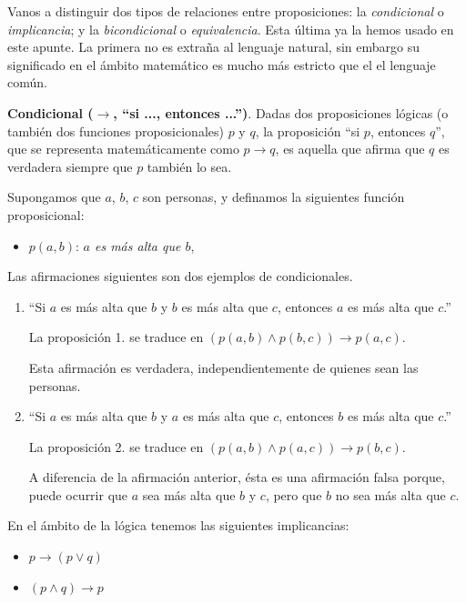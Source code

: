 Vanos a distinguir dos tipos de relaciones entre proposiciones: la \emph{condicional} o \emph{implicancia}; y la \emph{bicondicional} o \emph{equivalencia}. 
Esta última ya la hemos usado en este apunte.
La primera no es extraña al lenguaje natural, sin embargo su significado en el ámbito matemático es mucho más estricto que el el lenguaje común.


\textbf{Condicional ($\rightarrow$, ``si ..., entonces ...'')}.
Dadas dos proposiciones l\'ogicas (o también dos funciones proposicionales) $p$ y $q$, 
la proposici\'on ``si $p$, entonces $q$'',
que se representa matem\'aticamente como $p \rightarrow q$,
es aquella que afirma que $q$ es verdadera siempre que $p$ también lo sea. 

\begin{ejemplo}\leavevmode
	Supongamos que $a$, $b$, $c$ son personas, y definamos la siguientes función proposicional:
	\begin{itemize}
		\item $p(a,b)$: {\em $a$ es m\'as alta que $b$},
	\end{itemize}

	Las afirmaciones siguientes son dos ejemplos de condicionales.
	\begin{enumerate}
		\item ``Si $a$ es m\'as alta que $b$ y $b$ es m\'as alta que 
			$c$, entonces $a$ es m\'as alta que $c$.''
			
			La proposici\'on 1. se traduce en $(p(a,b) \wedge p(b,c)) \rightarrow p(a,c)$.
			
			Esta afirmaci\'on es verdadera, independientemente de quienes sean las personas.
			
		\item ``Si $a$ es m\'as alta que $b$ y $a$ es m\'as alta que $c$,
			entonces $b$ es m\'as alta que $c$.''
			
			
			La proposici\'on 2. se traduce en $(p(a,b) \wedge p(a,c)) \rightarrow p(b,c)$.
			
			A diferencia de la afirmaci\'on anterior, \'esta es una afirmaci\'on
			falsa porque, puede ocurrir que $a$ sea más alta que $b$ y $c$, pero que $b$ no sea más alta que $c$.
	\end{enumerate}

\end{ejemplo} 

\medskip

En el ámbito de la lógica tenemos las siguientes implicancias:

\begin{itemize}
\item $p\rightarrow (p\vee q)$
\item $(p\wedge q) \rightarrow p$
\end{itemize}

